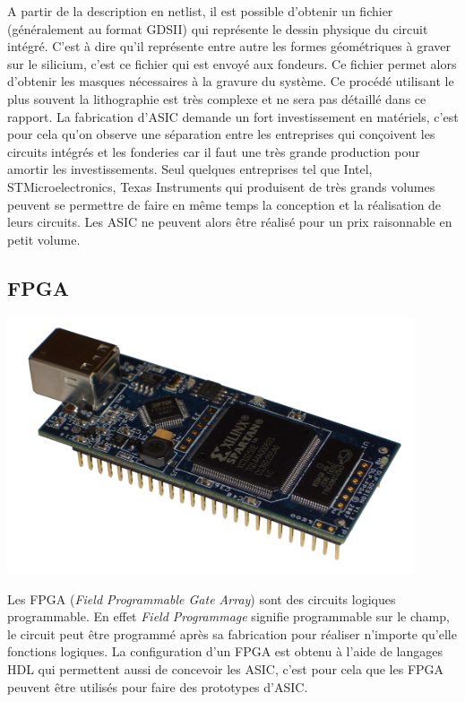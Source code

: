 A partir de la description en netlist, il est possible d'obtenir un fichier
(généralement au format GDSII) qui représente le dessin physique du circuit intégré.
C'est à dire qu'il représente entre autre les formes géométriques à graver sur le
silicium, c'est ce fichier qui est envoyé aux fondeurs. Ce fichier permet alors
d'obtenir les masques nécessaires à la gravure du système. Ce procédé utilisant le
plus souvent la lithographie est très complexe et ne sera pas détaillé dans ce
rapport. La fabrication d'ASIC demande un fort investissement en matériels, c'est
pour cela qu'on observe une séparation entre les entreprises qui conçoivent les
circuits intégrés et les fonderies car il faut une très grande production pour
amortir les investissements. Seul quelques entreprises tel que Intel,
STMicroelectronics, Texas Instruments qui produisent de très grands volumes peuvent
se permettre de faire en même temps la conception et la réalisation de leurs
circuits. Les ASIC ne peuvent alors être réalisé pour un prix raisonnable en petit
volume.


\subsection{FPGA}


\includegraphics[width=12cm]{fpga.png}

Les FPGA (\textit{Field Programmable Gate Array}) sont des circuits logiques
programmable. En effet \textit{Field Programmage} signifie programmable sur le champ,
le circuit peut être programmé après sa fabrication pour réaliser n'importe qu'elle
fonctions logiques. La configuration d'un FPGA est obtenu à l'aide de langages HDL
qui permettent aussi de concevoir les ASIC, c'est pour cela que les FPGA peuvent être
utilisés pour faire des prototypes d'ASIC.

